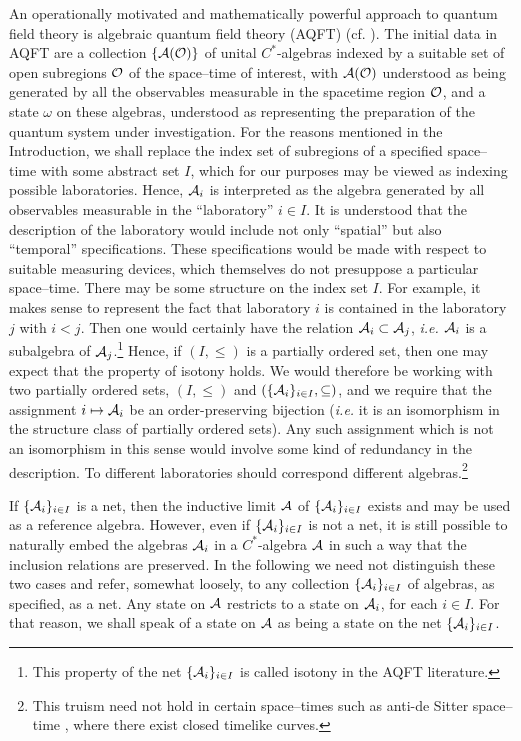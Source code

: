 \documentclass[a4paper,twoside,12pt]{article}
\def\inet{{\{\As_i \}_{i \in I}}}
\def\As{{\cal A}}
\def\Os{{\cal O}}
\begin{document}
     An operationally motivated and mathematically powerful approach
to quantum field theory is algebraic quantum field theory (AQFT) (cf.
\cite{Haag}). The initial data in AQFT are a collection $\{\As(\Os)\}$
of unital $C^*$-algebras indexed by a suitable set of open subregions
$\Os$ of the space--time of interest, with $\As(\Os)$ understood as
being generated by all the observables measurable in the spacetime
region $\Os$, and a state $\omega$ on these algebras, understood as
representing the preparation of the quantum system under
investigation. For the reasons mentioned in the Introduction, we shall
replace the index set of subregions of a specified space--time with
some abstract set $I$, which for our purposes may be viewed as
indexing possible laboratories.  Hence, $\As_i$ is interpreted as the
algebra generated by all observables measurable in the ``laboratory'' 
$i \in I$. It is understood that the description of the laboratory would
include not only ``spatial'' but also ``temporal'' specifications. 
These specifications would be made with respect to suitable measuring
devices, which themselves do not presuppose a particular space--time.
There may be some structure on the index set $I$. For example,
it makes sense to represent the fact that laboratory $i$ is contained
in the laboratory $j$ with $i < j$. Then one would certainly have
the relation $\As_i \subset \As_j$, {\it i.e.} $\As_i$ is a subalgebra
of $\As_j$.\footnote{This property of the net $\inet$ is called isotony 
in the AQFT literature.} 
Hence, if $(I,\leq)$ is a partially ordered set, then one may expect
that the property of isotony holds. We would therefore be working with two 
partially ordered sets, $(I,\leq)$ and $(\{ \As_i \}_{i \in I}, \subseteq)$, 
and we require that the assignment $i \mapsto \As_i$ be an order-preserving 
bijection ({\it i.e.} it is an isomorphism in the structure class of partially 
ordered sets). Any such assignment which is not an isomorphism in 
this sense would involve some kind of redundancy in the description. To 
different laboratories should correspond different algebras.\footnote{This
truism need not hold in certain space--times such as anti-de Sitter 
space--time \cite{BFS3,BFS4}, where there exist closed timelike curves.}

     If $\inet$ is a net, then the inductive limit $\As$ of $\inet$ exists
and may be used as a reference algebra. However, even if $\inet$ is not a net, 
it is still possible \cite{Fr} to naturally embed the algebras 
$\As_i$ in a $C^*$-algebra $\As$ in such a way that the inclusion relations 
are preserved. In the following we need not distinguish these two
cases and refer, somewhat loosely, to any collection $\{ \As_i \}_{i \in I}$ 
of algebras, as specified, as a net. Any  state on $\As$ restricts to
a state on $\As_i$, for each $i \in I$. For that reason, we shall speak of a 
state on $\As$ as being a state on the net $\inet$. 
\end{document}
